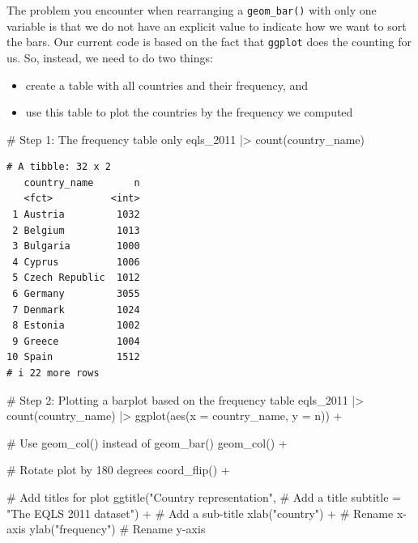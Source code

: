 \documentclass[
  letterpaper,
]{krantz}
\makeatletter
\newenvironment{Shaded}{\begin{snugshade}}{\end{snugshade}}
\newcommand{\AttributeTok}[1]{\textcolor[rgb]{0.40,0.45,0.13}{#1}}
\newcommand{\CommentTok}[1]{\textcolor[rgb]{0.37,0.37,0.37}{#1}}
\newcommand{\FunctionTok}[1]{\textcolor[rgb]{0.28,0.35,0.67}{#1}}
\newcommand{\NormalTok}[1]{\textcolor[rgb]{0.00,0.23,0.31}{#1}}
\newcommand{\SpecialCharTok}[1]{\textcolor[rgb]{0.37,0.37,0.37}{#1}}
\newcommand{\StringTok}[1]{\textcolor[rgb]{0.13,0.47,0.30}{#1}}
\newenvironment{kframe}{%
\medskip{}
\setlength{\fboxsep}{.8em}
 \def\at@end@of@kframe{}%
 \ifinner\ifhmode%
  \def\at@end@of@kframe{\end{minipage}}%
  \begin{minipage}{\columnwidth}%
 \fi\fi%
 \def\FrameCommand##1{\hskip\@totalleftmargin \hskip-\fboxsep
 \colorbox{shadecolor}{##1}\hskip-\fboxsep
     \hskip-\linewidth \hskip-\@totalleftmargin \hskip\columnwidth}%
 \MakeFramed {\advance\hsize-\width
   \@totalleftmargin\z@ \linewidth\hsize
   \@setminipage}}%
 {\par\unskip\endMakeFramed%
 \at@end@of@kframe}
\renewenvironment{Shaded}{\begin{kframe}}{\end{kframe}}
\makeatother
\begin{document}
The problem you encounter when rearranging a \texttt{geom\_bar()} with
only one variable is that we do not have an explicit value to indicate
how we want to sort the bars. Our current code is based on the fact that
\texttt{ggplot} does the counting for us. So, instead, we need to do two
things:

\begin{itemize}
\item
  create a table with all countries and their frequency, and
\item
  use this table to plot the countries by the frequency we computed
\end{itemize}

\begin{Shaded}
\begin{Highlighting}[]
\CommentTok{\# Step 1: The frequency table only}
\NormalTok{eqls\_2011 }\SpecialCharTok{|\textgreater{}} \FunctionTok{count}\NormalTok{(country\_name)}
\end{Highlighting}
\end{Shaded}

\begin{verbatim}
# A tibble: 32 x 2
   country_name       n
   <fct>          <int>
 1 Austria         1032
 2 Belgium         1013
 3 Bulgaria        1000
 4 Cyprus          1006
 5 Czech Republic  1012
 6 Germany         3055
 7 Denmark         1024
 8 Estonia         1002
 9 Greece          1004
10 Spain           1512
# i 22 more rows
\end{verbatim}

\begin{Shaded}
\begin{Highlighting}[]
\CommentTok{\# Step 2: Plotting a barplot based on the frequency table}
\NormalTok{eqls\_2011 }\SpecialCharTok{|\textgreater{}}
  \FunctionTok{count}\NormalTok{(country\_name) }\SpecialCharTok{|\textgreater{}}
  \FunctionTok{ggplot}\NormalTok{(}\FunctionTok{aes}\NormalTok{(}\AttributeTok{x =}\NormalTok{ country\_name, }\AttributeTok{y =}\NormalTok{ n)) }\SpecialCharTok{+}

  \CommentTok{\# Use geom\_col() instead of geom\_bar()}
  \FunctionTok{geom\_col}\NormalTok{() }\SpecialCharTok{+}
  
  \CommentTok{\# Rotate plot by 180 degrees}
  \FunctionTok{coord\_flip}\NormalTok{() }\SpecialCharTok{+}

  \CommentTok{\# Add titles for plot}
  \FunctionTok{ggtitle}\NormalTok{(}\StringTok{"Country representation"}\NormalTok{,              }\CommentTok{\# Add a title}
          \AttributeTok{subtitle =} \StringTok{"The EQLS 2011 dataset"}\NormalTok{) }\SpecialCharTok{+}  \CommentTok{\# Add a sub{-}title}
  \FunctionTok{xlab}\NormalTok{(}\StringTok{"country"}\NormalTok{) }\SpecialCharTok{+}                              \CommentTok{\# Rename x{-}axis}
  \FunctionTok{ylab}\NormalTok{(}\StringTok{"frequency"}\NormalTok{)                              }\CommentTok{\# Rename y{-}axis  }
\end{Highlighting}
\end{Shaded}
\end{document}
